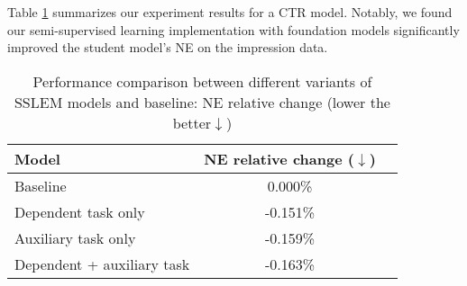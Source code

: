 Table \ref{ssl-em} summarizes our experiment results for a CTR model. Notably, we found our semi-supervised learning implementation with foundation models significantly improved the student model's NE on the impression data.

\begin{table}[t]
\caption{Performance comparison between different variants of SSLEM models and baseline: NE relative change (lower the better$\downarrow$)}
\label{ssl-em}
\centering
\begin{tabular}{lcc}
\toprule
 Model & NE relative change ($\downarrow$)   \\
\midrule
Baseline & 0.000\%\\
\hline
Dependent task only & -0.151\%  \\
\hline
Auxiliary task only & -0.159\%  \\
\hline
Dependent + auxiliary task & -0.163\% \\
\bottomrule
\end{tabular}
\end{table}
